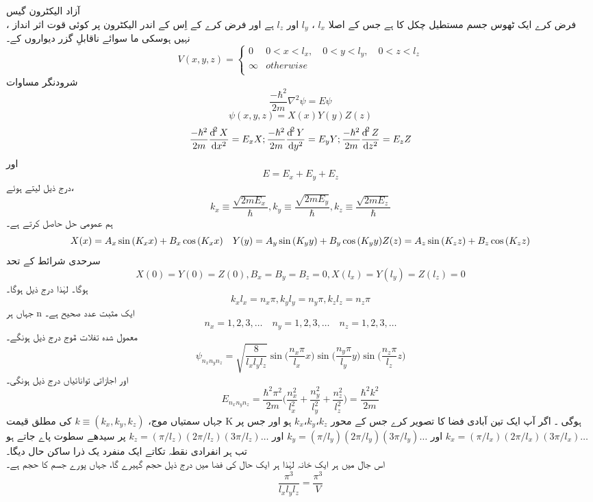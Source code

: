 آزاد الیکٹرون گیس\\
، فرض کرے ایک ٹھوس جسم مستطیل چکل کا ہے جس کے اصلا
 \(l_{x}\)
 ،
 \(l_{y}\)
  اور
 \(l_{z}\)
    ہے  اور فرض کرے کے اِس کے اندر الیکٹرون پر کوئی قوت اثر انداز نہیں ہوسکی ما سوائے ناقابلِ گزر دیواروں کے۔
\begin{equation}
V(x,y,z)=
\begin{cases}
0 & 0<x<l_{x}, \quad 0<y<l_{y}, \quad 0<z<l_{z}\\
\infty & otherwise\\
\end{cases}
\end{equation}
شرودنگر مساوات
\[\frac{-\hbar^{2}}{2m}\nabla^{2}\psi=E\psi\]
\[\psi(x,y,z)=X(x)Y(y)Z(z)\]
\[\frac{-\hbar^{2}}{2m}\frac{\dif^{2}X}{\dif{x}^{2}}=E_{x}X ; \frac{-\hbar^{2}}{2m}\frac{\dif^{2}Y}{\dif{y}^{2}}=E_{y}Y ; \frac{-\hbar^{2}}{2m}\frac{\dif^{2}Z}{\dif{z}^{2}}=E_{z}Z\]
اور
\[E=E_{x}+E_{y}+E_{z}\]
درج ذیل لیتے ہوئے،
\[k_{x}\equiv \frac{\sqrt{2mE_{x}}}{\hbar}, k_{y}\equiv\frac{\sqrt{2mE_{y}}}{\hbar}, k_{z}\equiv \frac{\sqrt{2mE_{z}}}{\hbar}\]
 ہم عمومی حل حاصل کرتے ہے۔
\begin{equation}
X(x)=A_{x}\sin{(K_{x}x)}+B_{x}\cos{(K_{x}x)} \quad Y(y)=A_{y}\sin{(K_{y}y)}+B_{y}\cos{(K_{y}y)}\\
Z(z)=A_{z}\sin{(K_{z}z)}+B_{z}\cos{(K_{z}z)}\\
\end{equation}
سرحدی شرائط کے تحد 
\[X(0)=Y(0)=Z(0), B_{x}=B_{y}=B_{z}=0, X(l_{x})=Y(l_{y})=Z(l_{z})=0\]
ہوگا۔ لہٰذا درج ذیل ہوگا۔
\[k_{x}l_{x}=n_{x}\pi, k_{y}l_{y}=n_{y}\pi, k_{z}l_{z}=n_{z}\pi\]
جہاں ہر n ایک مثبت عدد صحیح ہے۔
\[n_{x}=1,2,3,\dotsc \quad n_{y}=1,2,3,\dotsc \quad n_{z}=1,2,3,\dotsc\]
معمول شدہ تفلات مٌوج درج ذیل ہونگے۔
\[\psi_{n_{x}n_{y}n_{z}}=\sqrt{\frac{8}{l_{x}l_{y}l_{z}}}\sin{\big(\frac{n_{x}\pi}{l_{x}} x\big)}\sin{\big(\frac{n_{y}\pi}{l_{y}} y\big)}\sin{\big(\frac{n_{z}\pi}{l_{z}} z\big)}\]
اور اجازاتی توانائياں درج ذیل ہونگی۔
\[E_{n_{x}n_{y}n_{z}}=\frac{\hbar^{2}\pi^{2}}{2m}\big(\frac{n_{x}^{2}}{l_{x}^{2}}+\frac{n_{y}^{2}}{l_{y}^{2}}+\frac{n_{z}^{2}}{l_{z}^{2}}\big )=\frac{\hbar^{2}k^{2}}{2m}\]
جہاں سمتیاں موج، 
\(k\equiv (k_{x},k_{y},k_{z})\)
 کی مطلق قیمت K ہوگی ۔
اگر آپ ایک تین آبادی فضا کا تصویر کرے جس کے محور
\(k_{x}، k_{y} ،k_{z}\)
 ہو اور جس پر
\(k_{x}=(\pi/l_{x})(2\pi/l_{x})(3\pi/l_{x})\dotsc\)
اور
\(k_{y}=(\pi/l_{y})(2\pi/l_{y})(3\pi/l_{y})\dotsc\)
اور
\(k_{z}=(\pi/l_{z})(2\pi/l_{z})(3\pi/l_{z})\dotsc\)
پر سیدھے سطوت پاے جاتے ہو تب ہر انفرادی نقطہ تکاتے ایک منفرد یک ذرا ساکن حال دیگا۔\\
اس جال میں ہر ایک خانہ لہٰذا ہر ایک حال کی فضا میں درج ذیل حجم گہیرے گا، جہاں  پورے جسم کا حجم ہے۔
\[\frac{\pi^{3}}{l_{x}l_{y}l_{z}}=\frac{\pi^{3}}{V}\]


